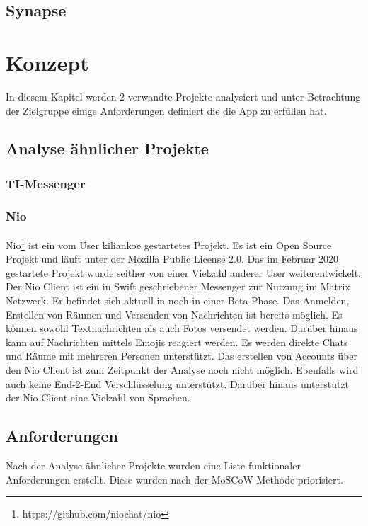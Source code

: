     \section{Synapse}\label{sec:synapse}

    \chapter{Konzept}\label{ch:konzept}
    In diesem Kapitel werden 2 verwandte Projekte analysiert und unter Betrachtung der Zielgruppe einige Anforderungen definiert die die App zu erfüllen hat.

    \section{Analyse ähnlicher Projekte}\label{sec:analyse-ahnlicher-projekte}

    \subsection{TI-Messenger}\label{subsec:ti-messenger}

    \subsection{Nio}
    Nio\footnote{https://github.com/niochat/nio} ist ein vom User kiliankoe gestartetes Projekt.
    Es ist ein Open Source Projekt und läuft unter der Mozilla Public License 2.0.
    Das im Februar 2020 gestartete Projekt wurde seither von einer Vielzahl anderer User weiterentwickelt.
    Der Nio Client ist ein in Swift geschriebener Messenger zur Nutzung im Matrix Netzwerk.
    Er befindet sich aktuell in noch in einer Beta-Phase.
    Das Anmelden, Erstellen von Räumen und Versenden von Nachrichten ist bereits möglich.
    Es können sowohl Textnachrichten als auch Fotos versendet werden.
    Darüber hinaus kann auf Nachrichten mittels Emojis reagiert werden.
    Es werden direkte Chats und Räume mit mehreren Personen unterstützt.
    Das erstellen von Accounts über den Nio Client ist zum Zeitpunkt der Analyse noch nicht möglich.
    Ebenfalls wird auch keine End-2-End Verschlüsselung unterstützt.
    Darüber hinaus unterstützt der Nio Client eine Vielzahl von Sprachen.

    \newpage
    \section{Anforderungen}\label{sec:anforderungen}
    Nach der Analyse ähnlicher Projekte wurden eine Liste funktionaler Anforderungen erstellt.
    Diese wurden nach der MoSCoW-Methode priorisiert.\\

